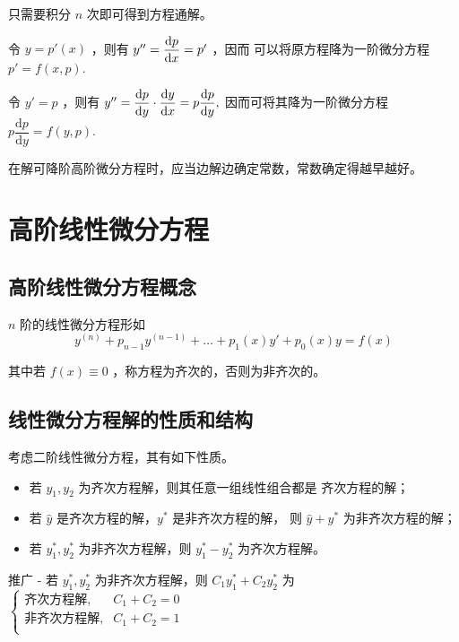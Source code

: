 
只需要积分 $ n $ 次即可得到方程通解。


令 $ y = p'(x) $ ，则有 $ y^{\prime\prime} = \dfrac{\mathrm{d} p}{\mathrm{d}x}  =p' $ ，因而
可以将原方程降为一阶微分方程 $ p' = f(x,p). $ 


令 $ y' = p $ ，则有 $ y^{\prime\prime} = \dfrac{\mathrm{d}p}{\mathrm{d}y}\cdot \dfrac{\mathrm{d}y}{\mathrm{d}x}
=p\dfrac{\mathrm{d}p}{\mathrm{d}y}, $ 因而可将其降为一阶微分方程 $ p\dfrac{\mathrm{d}p}{\mathrm{d}y} = f(y,p). $ 

在解可降阶高阶微分方程时，应当边解边确定常数，常数确定得越早越好。

\section{高阶线性微分方程}

\subsection{高阶线性微分方程概念}

$ n $ 阶的线性微分方程形如$$
    y^{(n)}+p_{n-1}y^{(n-1)} + \dots + p_1(x)y'+p_0(x)y = f(x)
$$ 

其中若 $ f(x)\equiv 0 $ ，称方程为齐次的，否则为非齐次的。

\subsection{线性微分方程解的性质和结构}

考虑二阶线性微分方程，其有如下性质。

\begin{itemize}
    \item 若 $ y_1,y_2 $ 为齐次方程解，则其任意一组线性组合都是
    齐次方程的解；
    \item 若 $ \hat y $ 是齐次方程的解，$ y^* $ 是非齐次方程的解，
    则 $ \hat y + y^* $ 为非齐次方程的解；
    \item 若 $ y_1^*,y_2^* $ 为非齐次方程解，则 $ y_1^* - y_2^* $ 为齐次方程解。
\end{itemize}

推广 - 若 $ y_1^*,y_2^* $ 为非齐次方程解，则 $ C_1y_1^* + C_2y_2^* $ 为
$ \begin{cases}
    \textrm{齐次方程解}, & C_1+C_2 = 0 \\ 
    \textrm{非齐次方程解}, & C_1+C_2 = 1 \\
\end{cases} $ 


